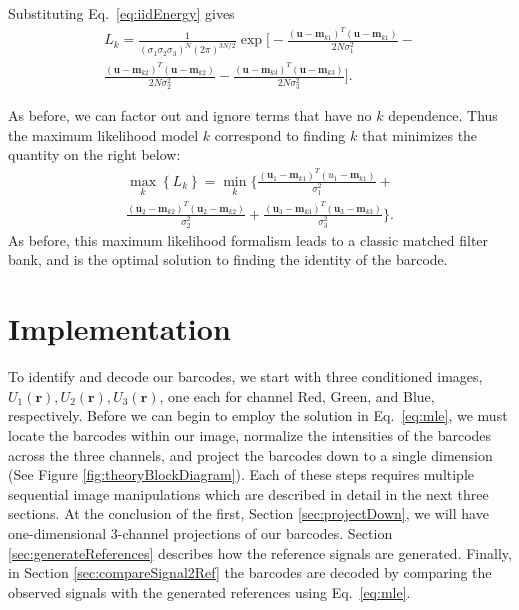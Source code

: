 Substituting Eq.~\ref{eq:iidEnergy} gives
\begin{multline}
L_k=\frac{1}{ (\sigma_1\sigma_2\sigma_3)^N  (2\pi)^{3N/2}  }  \exp\Bigg[ -\frac{(\mathbf{u}-\mathbf{m}_{k1})^T(\mathbf{u}-\mathbf{m}_{k1})} {2 N \sigma_1^2 }   - \\ \frac{(\mathbf{u}-\mathbf{m}_{k2})^T(\mathbf{u}-\mathbf{m}_{k2})} {2 N \sigma_2^2 } -\frac{(\mathbf{u}-\mathbf{m}_{k3})^T(\mathbf{u}-\mathbf{m}_{k3})} {2 N \sigma_3^2 }    \Bigg].
\end{multline}

As before, we can factor out and ignore terms that have no $k$ dependence. Thus the maximum likelihood model $k$ correspond to finding $k$ that minimizes the quantity on the right below:
\begin{multline}\label{eq:mle}
\max_k   \left\{ L_k \right\} =  \min_k  \Bigg\{  \frac{(\mathbf{u}_1-\mathbf{m}_{k1})^T(u_1-\mathbf{m}_{k1})}{\sigma_1^2} +\\  
\frac{(\mathbf{u}_2-\mathbf{m}_{k2})^T(\mathbf{u}_2-\mathbf{m}_{k2})}{\sigma_2^2} + \frac{(\mathbf{u}_3-\mathbf{m}_{k3})^T(\mathbf{u}_3-\mathbf{m}_{k3})}{\sigma_3^2} \Bigg\}. 
\end{multline}
As before, this maximum likelihood formalism leads to a classic matched filter bank, and is the optimal solution to finding the identity of the barcode.

\section{Implementation}
To identify and decode our barcodes, we start with three conditioned images, $U_1(\mathbf{r}), U_2(\mathbf{r}), U_3(\mathbf{r})$, one each for channel Red, Green, and Blue, respectively.  Before we can begin to employ the solution in Eq.~\ref{eq:mle}, we must locate the barcodes within our image, normalize the intensities of the barcodes across the three channels, and project the barcodes down to a single dimension (See Figure \ref{fig:theoryBlockDiagram}). Each of these steps requires multiple sequential image manipulations which are described in detail in the next three sections. At the conclusion of the first, Section \ref{sec:projectDown}, we will  have one-dimensional 3-channel projections of our barcodes. Section \ref{sec:generateReferences} describes how the reference signals are generated. Finally, in Section \ref{sec:compareSignal2Ref} the barcodes are decoded by comparing the observed signals with the generated references  using Eq.~\ref{eq:mle}.


